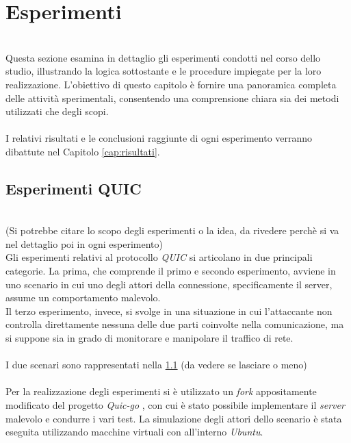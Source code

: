 \section{Esperimenti}
~\\
\indent Questa sezione esamina in dettaglio gli esperimenti condotti nel corso dello studio, illustrando la logica sottostante e le procedure impiegate per la loro realizzazione. 
L'obiettivo di questo capitolo è fornire una panoramica completa delle attività sperimentali, consentendo una comprensione chiara sia dei metodi utilizzati che degli scopi.
\\\\
\noindent I relativi risultati e le conclusioni raggiunte di ogni esperimento verranno dibattute nel Capitolo \ref{cap:risultati}.

\subsection{Esperimenti QUIC}
~\\ 
(Si potrebbe citare lo scopo degli esperimenti o la idea, da rivedere perchè si va nel dettaglio poi in ogni esperimento)
\\
\indent Gli esperimenti relativi al protocollo \emph{QUIC} si articolano in due principali categorie. 
La prima, che comprende il primo e secondo esperimento, avviene in uno scenario in cui uno degli attori della connessione, specificamente il server, assume un comportamento malevolo.
\\
Il terzo esperimento, invece, si svolge in una situazione in cui l'attaccante non controlla direttamente nessuna delle due parti coinvolte nella comunicazione, ma si suppone sia in grado di monitorare e manipolare il traffico di rete.
\\\\
\noindent I due scenari sono rappresentati nella \ref{} (da vedere se lasciare o meno)
\\\\
Per la realizzazione degli esperimenti si è utilizzato un \emph{fork} appositamente modificato del progetto \emph{Quic-go} \cite{site:my-fork}, 
con cui è stato possibile implementare il \emph{server} malevolo e condurre i vari test.
La simulazione degli attori dello scenario è stata eseguita utilizzando macchine virtuali con all'interno \emph{Ubuntu}.

